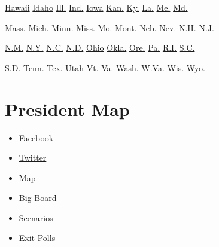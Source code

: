 \href{states/hawaii.html}{Hawaii} \href{states/idaho.html}{Idaho}
\href{states/illinois.html}{Ill.} \href{states/indiana.html}{Ind.}
\href{states/iowa.html}{Iowa} \href{states/kansas.html}{Kan.}
\href{states/kentucky.html}{Ky.} \href{states/louisiana.html}{La.}
\href{states/maine.html}{Me.} \href{states/maryland.html}{Md.}

\href{states/massachusetts.html}{Mass.}
\href{states/michigan.html}{Mich.} \href{states/minnesota.html}{Minn.}
\href{states/mississippi.html}{Miss.} \href{states/missouri.html}{Mo.}
\href{states/montana.html}{Mont.} \href{states/nebraska.html}{Neb.}
\href{states/nevada.html}{Nev.} \href{states/new-hampshire.html}{N.H.}
\href{states/new-jersey.html}{N.J.}

\href{states/new-mexico.html}{N.M.} \href{states/new-york.html}{N.Y.}
\href{states/north-carolina.html}{N.C.}
\href{states/north-dakota.html}{N.D.} \href{states/ohio.html}{Ohio}
\href{states/oklahoma.html}{Okla.} \href{states/oregon.html}{Ore.}
\href{states/pennsylvania.html}{Pa.}
\href{states/rhode-island.html}{R.I.}
\href{states/south-carolina.html}{S.C.}

\href{states/south-dakota.html}{S.D.}
\href{states/tennessee.html}{Tenn.} \href{states/texas.html}{Tex.}
\href{states/utah.html}{Utah} \href{states/vermont.html}{Vt.}
\href{states/virginia.html}{Va.} \href{states/washington.html}{Wash.}
\href{states/west-virginia.html}{W.Va.}
\href{states/wisconsin.html}{Wis.} \href{states/wyoming.html}{Wyo.}

\hypertarget{president-map}{%
\section{President Map}\label{president-map}}

\begin{itemize}
\tightlist
\item
  \href{//www.facebookcorewwwi.onion/share.php?u=http\%3A\%2F\%2Felections.nytimes3xbfgragh.onion\%2F2012\%2Fresults\%2Fpresident.html}{Facebook}
\item
  \href{//twitter.com/share?text=Map\%3A+Current+presidential+race+results\&url=http\%3A\%2F\%2Felections.nytimes3xbfgragh.onion\%2F2012\%2Fresults\%2Fpresident.html\&via=nytimes}{Twitter}
\end{itemize}

\begin{itemize}
\tightlist
\item
  \href{president.html}{Map}
\item
  \href{president/big-board.html}{Big Board}
\item
  \href{president/scenarios.html}{Scenarios}
\item
  \href{president/exit-polls.html}{Exit Polls}
\end{itemize}

